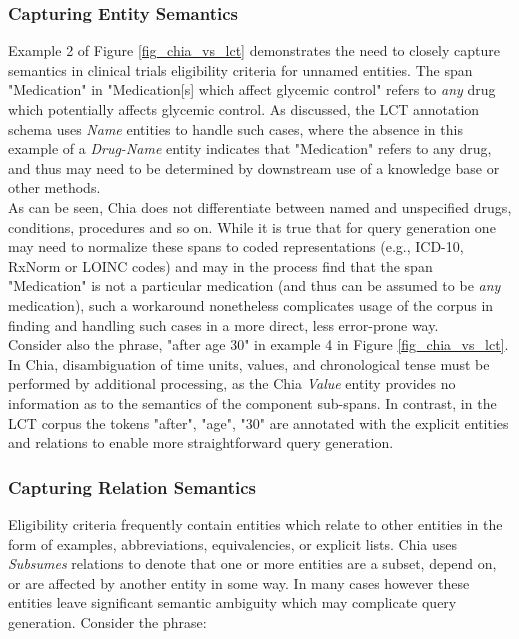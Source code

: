 \documentclass[../main.tex]{subfiles}
\begin{document}
\subsubsection*{Capturing Entity Semantics}
\noindent Example 2 of Figure \ref{fig_chia_vs_lct} demonstrates the need to closely capture semantics in clinical trials eligibility criteria for unnamed entities. The span "Medication" in "Medication[s] which affect glycemic control" refers to \textit{any} drug which potentially affects glycemic control. As discussed, the LCT annotation schema uses \textit{Name} entities to handle such cases, where the absence in this example of a \textit{Drug-Name} entity indicates that "Medication" refers to any drug, and thus may need to be determined by downstream use of a knowledge base or other methods. \\

\noindent As can be seen, Chia does not differentiate between named and unspecified drugs, conditions, procedures and so on. While it is true that for query generation one may need to normalize these spans to coded representations (e.g., ICD-10, RxNorm or LOINC codes) and may in the process find that the span "Medication" is not a particular medication (and thus can be assumed to be \textit{any} medication), such a workaround nonetheless complicates usage of the corpus in finding and handling such cases in a more direct, less error-prone way. \\

\noindent Consider also the phrase, "after age 30" in example 4 in Figure \ref{fig_chia_vs_lct}. In Chia, disambiguation of time units, values, and chronological tense must be performed by additional processing, as the Chia \textit{Value} entity provides no information as to the semantics of the component sub-spans. In contrast, in the LCT corpus the tokens "after", "age", "30" are annotated with the explicit entities and relations to enable more straightforward query generation. \\

\subsubsection*{Capturing Relation Semantics}
Eligibility criteria frequently contain entities which relate to other entities in the form of examples, abbreviations, equivalencies, or explicit lists. Chia uses \textit{Subsumes} relations to denote that one or more entities are a subset, depend on, or are affected by another entity in some way. In many cases however these entities leave significant semantic ambiguity which may complicate query generation. Consider the phrase:
\end{document}
